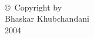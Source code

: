 
\thispagestyle{empty}
\hbox{\ }

\vfill
\renewcommand{\baselinestretch}{1}
\small\normalsize

\vspace{-.65in}

\begin{center}
\large{\copyright \hbox{ }Copyright by\\
Bhaskar Khubchandani  %
\\
2004}
\end{center}

\vfill

